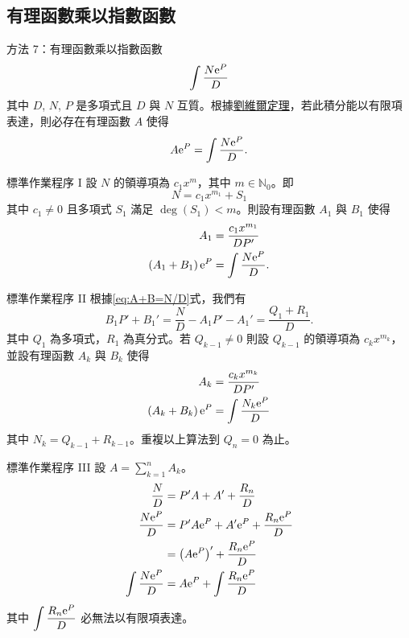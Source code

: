 \documentclass{beamer}
\newcommand{\e}{\textup e}
\newcommand{\N}{\mathbb N}
\theoremstyle{remark}
\begin{document}
\subsection[有理函數乘以指數]{有理函數乘以指數函數}
\begin{frame}{方法 7：有理函數乘以指數函數}
  \[\int \frac{N \e^P}{D}\]
  其中 $D$, $N$, $P$ 是多項式且 $D$ 與 $N$ 互質。根據\href{http://en.wikipedia.org/wiki/Liouville\%27s\textunderscore%
  theorem\textunderscore \%28differential\textunderscore algebra\%29}{劉維爾定理}，若此積分能以有限項表達，則必存在有理函數
  $A$ 使得
  \[A \e^P = \int \frac{N \e^P}{D}.\]
\end{frame}

\begin{frame}{標準作業程序 I}
  設 $N$ 的領導項為 $c_1 x^m$，其中 $m \in \N_0$。即
  \[N = c_1 x^{m_1} + S_1\]
  其中 $c_1 \ne 0$ 且多項式 $S_1$ 滿足 $\deg(S_1) < m$。則設有理函數 $A_1$ 與 $B_1$ 使得
  \begin{align}
    A_1 &= \frac{c_1 x^{m_1}}{DP'} \nonumber \\
    \left( A_1 + B_1 \right) \e^P &= \int \frac{N \e^P}{D}. \label{eq:A+B=N/D}
  \end{align}
\end{frame}

\begin{frame}{標準作業程序 II}
  根據\eqref{eq:A+B=N/D}式，我們有
  \[B_1 P' + B_1' = \frac N D - A_1 P' - A_1' = \frac{Q_1 + R_1}{D}.\]
  其中 $Q_1$ 為多項式，$R_1$ 為真分式。若 $Q_{k-1} \ne 0$ 則設 $Q_{k-1}$ 的領導項為 $c_k x^{m_k}$，並設有理函數
  $A_k$ 與 $B_k$ 使得
  \begin{align*}
    A_k &= \frac{c_k x^{m_k}}{DP'}\\
    \left( A_k + B_k \right) \e^P &= \int \frac{N_k \e^P}{D}
  \end{align*}
  其中 $N_k = Q_{k-1} + R_{k-1}$。重複以上算法到 $Q_n = 0$ 為止。
\end{frame}

\begin{frame}{標準作業程序 III}
  設 $\displaystyle A = \sum_{k=1}^n A_k$。
  \begin{align*}
    \frac N D &= P'A + A' + \frac{R_n}{D}\\
    \frac{N \e^P}{D} &= P'A \e^P + A' \e^P + \frac{R_n \e^P}{D}\\
      &= \left( A \e^P \right)' + \frac{R_n \e^P}{D}\\
    \int \frac{N \e^P}{D} &= A \e^P + \int \frac{R_n \e^P}{D}
  \end{align*}
  其中 $\displaystyle \int \frac{R_n \e^P}{D}$ 必無法以有限項表達。
\end{frame}
\end{document}
